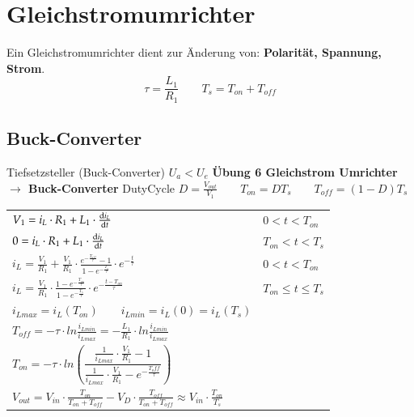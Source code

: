 \section{Gleichstromumrichter}
Ein Gleichstromumrichter dient zur Änderung von: \textbf{Polarität, Spannung, Strom}.\newline
\vspace{-0.2cm}
\[ \tau=\frac{L_1}{R_1} \qquad T_s=T_{on} + T_{off}\]
\vspace{-1cm}
\subsection{Buck-Converter}
\begin{minipage}{0.75\linewidth}
    Tiefsetzsteller (Buck-Converter) $U_a < U_e  $\newline
    \textbf{Übung 6 Gleichstrom Umrichter $ \rightarrow $ Buck-Converter}\newline
    DutyCycle $ D = \frac{V_{out}}{V_1} \qquad T_{on} = DT_s \qquad T_{off} = (1 -D)T_s $\newline
    \renewcommand{\arraystretch}{2}
    \begin{tabular}{p{9cm} p{3cm}}
        $ V_1 = i_L\cdot R_1+L_1\cdot\frac{\mathop{}\!\mathrm{d} i_L}{\mathop{}\!\mathrm{d} t} $ &
        $ 0<t<T_{on} $
        \\  
        $ 0 = i_L\cdot R_1+L_1\cdot\frac{\mathop{}\!\mathrm{d} i_L}{\mathop{}\!\mathrm{d} t}$ & $T_{on}<t<T_{s} $
        \\  
        $ i_L=\frac{V_1}{R_1}+ \frac{V_1}{R_1}\cdot \frac{e^{-\frac{T_{off}}{\tau}}-1}{1-e^{-\frac{T_{s}}{\tau}}}\cdot e^{-\frac{t}{\tau}}$ &
        $ 0<t<T_{on}  $
        \\  
        $ i_L=\frac{V_1}{R_1}\cdot \frac{1-e^{-\frac{T_{on}}{\tau}}}{1-e^{-\frac{T_{s}}{\tau}}}\cdot e^{-\frac{t-T_{on}}{\tau}}$ &
        $ T_{on}\leq t \leq T_{s}  $
        \\ 
        $ i_{Lmax} = i_L(T_{on}) \qquad i_{Lmin} = i_L(0) = i_L(T_s) $    
        & \\ 
        $ T_{off}=-\tau \cdot ln\frac{i_{Lmin}}{i_{Lmax}}= -\frac{L_1}{R_1}\cdot ln\frac{i_{Lmin}}{i_{Lmax}} $
        & \\    
        $ T_{on}=-\tau \cdot ln\left(\dfrac{\frac{1}{i_{Lmax}}\cdot\frac{V_1}{R_1}-1}{\frac{1}{i_{Lmax}}\cdot \frac{V_1}{R_1}-e^{-\frac{T_off}{\tau}}}\right) $
        & \\ 
        $ V_{out}=V_{in}\cdot \frac{T_{on}}{T_{on}+T_{off}}-V_D\cdot\frac{T_{off}}{T_{on}+T_{off}} \approx V_{in}\cdot\frac{T_{on}}{T_s} $
        & \\ 
    \end{tabular}
    \newline
    \renewcommand{\arraystretch}{1}
\end{minipage}

